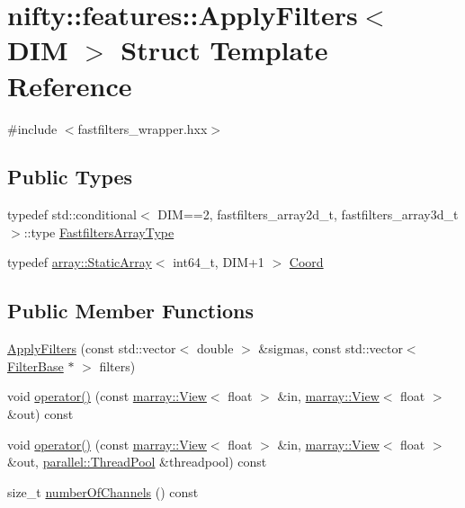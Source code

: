 \hypertarget{structnifty_1_1features_1_1ApplyFilters}{}\section{nifty\+:\+:features\+:\+:Apply\+Filters$<$ D\+I\+M $>$ Struct Template Reference}
\label{structnifty_1_1features_1_1ApplyFilters}


{\ttfamily \#include $<$fastfilters\+\_\+wrapper.\+hxx$>$}

\subsection*{Public Types}
\begin{DoxyCompactItemize}
\item 
typedef std\+::conditional$<$ D\+I\+M==2, fastfilters\+\_\+array2d\+\_\+t, fastfilters\+\_\+array3d\+\_\+t $>$\+::type \hyperlink{structnifty_1_1features_1_1ApplyFilters_adfddd3f0fdaa0179cc23100901565774}{Fastfilters\+Array\+Type}
\item 
typedef \hyperlink{namespacenifty_1_1array_a683f151f19c851754e0c6d55ed16a0c2}{array\+::\+Static\+Array}$<$ int64\+\_\+t, D\+I\+M+1 $>$ \hyperlink{structnifty_1_1features_1_1ApplyFilters_a0a26d161f300b3394044f1357ae5ebfd}{Coord}
\end{DoxyCompactItemize}
\subsection*{Public Member Functions}
\begin{DoxyCompactItemize}
\item 
\hyperlink{structnifty_1_1features_1_1ApplyFilters_a21bb107c65ee2783993d6de3170d2922}{Apply\+Filters} (const std\+::vector$<$ double $>$ \&sigmas, const std\+::vector$<$ \hyperlink{structnifty_1_1features_1_1FilterBase}{Filter\+Base} $\ast$ $>$ filters)
\item 
void \hyperlink{structnifty_1_1features_1_1ApplyFilters_a075f9232abd8d323ba121b2bdd49fa17}{operator()} (const \hyperlink{classandres_1_1View}{marray\+::\+View}$<$ float $>$ \&in, \hyperlink{classandres_1_1View}{marray\+::\+View}$<$ float $>$ \&out) const 
\item 
void \hyperlink{structnifty_1_1features_1_1ApplyFilters_a6fc96c356178496a7b6c08c8e429dead}{operator()} (const \hyperlink{classandres_1_1View}{marray\+::\+View}$<$ float $>$ \&in, \hyperlink{classandres_1_1View}{marray\+::\+View}$<$ float $>$ \&out, \hyperlink{classnifty_1_1parallel_1_1ThreadPool}{parallel\+::\+Thread\+Pool} \&threadpool) const 
\item 
size\+\_\+t \hyperlink{structnifty_1_1features_1_1ApplyFilters_afb7d56d68a25b2aaf2de29e3d6f39cff}{number\+Of\+Channels} () const 
\end{DoxyCompactItemize}


